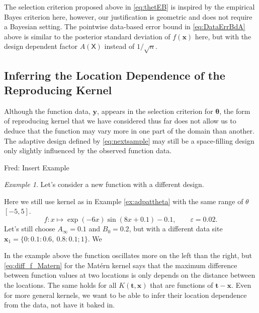\documentclass[]{mcom-l}
\theoremstyle{remark}
\newtheorem{example}{Example}
\newcommand{\mX}{\mathsf{X}}
\newcommand{\bx}{{\boldsymbol{x}}}
\newcommand{\by}{{\boldsymbol{y}}}
\newcommand{\bt}{{\boldsymbol{t}}}
\newcommand{\btheta}{{\boldsymbol{\theta}}}
\newcommand{\FredNote}[1]{{\color{blue}Fred: #1}}
\begin{document}
The selection criterion proposed above in \eqref{eq:thetEB} is inspired by the empirical Bayes criterion here, however, our justification is geometric and does not require a Bayesian setting.  The pointwise data-based error bound in \eqref{eq:DataErrBdA} above is similar to the posterior standard deviation of $f(\bx)$ here, but with the design dependent factor $A(\mX)$ instead of $1/\sqrt{n}$.


\subsection{Inferring the Location Dependence of the Reproducing Kernel} \label{sec:InferSpace}

Although the function data, $\by$, appears in the selection criterion for $\btheta$, the form of reproducing kernel that we have considered thus far does not allow us to deduce that the function may vary more in one part of the domain than another.  The adaptive design defined by \eqref{eq:nextsample} may still be a space-filling design only slightly influenced by the observed function data.

\FredNote{Insert Example}
\begin{example}
\label{ex:compfun}
	Let's consider a new function with a different design.

Here we still use kernel as in
Example \ref{ex:adpattheta} with the same range of $\theta$ $[-5,5].$ 
		 \[f: x \mapsto 
		 \exp(-6x)\sin(8x+0.1) - 0.1, \qquad \varepsilon = 0.02.\]
	Let's still choose  $A_\infty = 0.1$ and $B_0 =0.2$, but with a different data site $\bx_1=\{0:0.1:0.6,\ 0.8:0.1;1\}$.
We 

	
\end{example}
In the example above the function oscillates more on the left than the right, but \eqref{eq:diff_f_Matern} for the Mat\'ern kernel says that the maximum difference between function values at two locations is only depends on the distance between the locations.  The same holds for all $K(\bt ,\bx)$ that are  functions of $\bt - \bx$.  Even for more general kernels, we want to be able to infer their location dependence from the data, not have it baked in.
\end{document}
